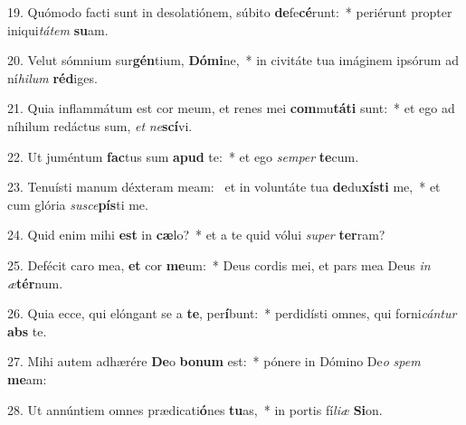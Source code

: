 19. Quómodo facti sunt in desolatiónem, súbito \textbf{de}fe\textbf{cé}runt:~*  periérunt propter iniqui\textit{tá}\textit{tem} \textbf{su}am.\

20. Velut sómnium sur\textbf{gén}tium, \textbf{Dó}\textbf{mi}ne,~*  in civitáte tua imáginem ipsórum ad ní\textit{hi}\textit{lum} \textbf{réd}iges.\

21. Quia inflammátum est cor meum, et renes mei \textbf{com}mu\textbf{tá}\textbf{ti} sunt:~*  et ego ad níhilum redáctus sum, \textit{et} \textit{ne}\textbf{scí}vi.\

22. Ut juméntum \textbf{fac}tus sum \textbf{a}\textbf{pud} te:~*  et ego \textit{sem}\textit{per} \textbf{te}cum.\

23. Tenuísti manum déxteram meam: \dag\  et in voluntáte tua \textbf{de}du\textbf{xís}\textbf{ti} me,~*  et cum glória \textit{su}\textit{sce}\textbf{pís}ti me.\

24. Quid enim mihi \textbf{est} in \textbf{cæ}lo?~*  et a te quid vólui \textit{su}\textit{per} \textbf{ter}ram?\

25. Defécit caro mea, \textbf{et} cor \textbf{me}um:~*  Deus cordis mei, et pars mea Deus \textit{in} \textit{æ}\textbf{tér}num.\

26. Quia ecce, qui elóngant se a \textbf{te}, per\textbf{í}bunt:~*  perdidísti omnes, qui forni\textit{cán}\textit{tur} \textbf{abs} te.\

27. Mihi autem adhærére \textbf{De}o \textbf{bo}\textbf{num} est:~*  pónere in Dómino De\textit{o} \textit{spem} \textbf{me}am:\

28. Ut annúntiem omnes prædicati\textbf{ó}nes \textbf{tu}as,~*  in portis fí\textit{li}\textit{æ} \textbf{Si}on.\

